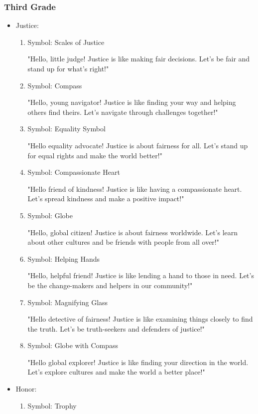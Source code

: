\documentclass[14pt, letterpaper, twoside]{article}
\begin{document}
	\subsubsection{Third Grade}
	\begin{itemize}
	\item Justice:
		\begin{enumerate}
		\item Symbol: Scales of Justice 
		
		"Hello, little judge! Justice is like making fair decisions. Let's be fair and
		stand up for what's right!"
		\item Symbol: Compass 
		
		"Hello, young navigator! Justice is like finding your way and helping others find
		theirs. Let's navigate through challenges together!"
		\item Symbol: Equality Symbol 
		
		"Hello equality advocate! Justice is about fairness for all. Let's stand up for
		equal rights and make the world better!"
		\item Symbol: Compassionate Heart 
		
		"Hello friend of kindness! Justice is like having a compassionate heart. Let's
		spread kindness and make a positive impact!"
		\item Symbol: Globe 
		
		"Hello, global citizen! Justice is about fairness worldwide. Let's learn about
		other cultures and be friends with people from all over!"
		\item Symbol: Helping Hands 
		
		"Hello, helpful friend! Justice is like lending a hand to those in need. Let's be
		the change-makers and helpers in our community!"
		\item Symbol: Magnifying Glass 
		
		"Hello detective of fairness! Justice is like examining things closely to find the
		truth. Let's be truth-seekers and defenders of justice!"
		\item Symbol: Globe with Compass 
		
		"Hello global explorer! Justice is like finding your direction in the world. Let's
		explore cultures and make the world a better place!"
		\end{enumerate}
	\item Honor:
		\begin{enumerate}
		\item Symbol: Trophy 
		

\end{enumerate}
\end{itemize}
\end{document}
